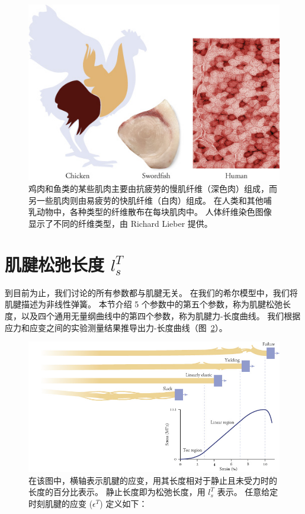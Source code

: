 \begin{figure}[!htb]
	\centering
	\includegraphics[width=0.8\linewidth]{chap5/5_6}
	\caption{鸡肉和鱼类的某些肌肉主要由抗疲劳的慢肌纤维（深色肉）组成，而另一些肌肉则由易疲劳的快肌纤维（白肉）组成。
		在人类和其他哺乳动物中，各种类型的纤维散布在每块肌肉中。
		人体纤维染色图像显示了不同的纤维类型，由 Richard Lieber 提供。 \label{fig:5_6}}
\end{figure}


\section{肌腱松弛长度 $l_s^T$}

到目前为止，我们讨论的所有参数都与肌腱无关。
在我们的希尔模型中，我们将肌腱描述为非线性弹簧。
本节介绍 5 个参数中的第五个参数，称为肌腱松弛长度，以及四个通用无量纲曲线中的第四个参数，称为肌腱力-长度曲线。
我们根据应力和应变之间的实验测量结果推导出力-长度曲线（图~\ref{fig:5_7}）。


\begin{figure}[!htb]
	\centering
	\includegraphics[width=0.8\linewidth]{chap5/5_7}
	\caption{在该图中，横轴表示肌腱的应变，用其长度相对于静止且未受力时的长度的百分比表示。
		静止长度即为松弛长度，用 $l_s^T$ 表示。
		任意给定时刻肌腱的应变 ($\epsilon^T$) 定义如下： \label{fig:5_7}}
\end{figure}


